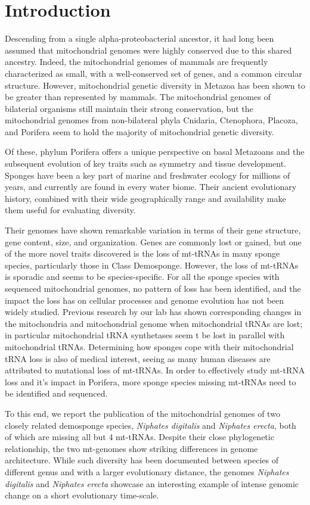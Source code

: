\documentclass[../main.tex]{subfiles}
\begin{document}
\newpage
\section{Introduction}
Descending from a single alpha-proteobacterial ancestor, it had long been assumed that mitochondrial genomes were highly conserved due to this shared ancestry. Indeed, the mitochondrial genomes of mammals are frequently characterized as small, with a well-conserved set of genes, and a common circular structure. However,  mitochondrial genetic diversity in Metazoa has been shown to be greater than represented by mammals. The mitochondrial genomes of bilaterial organisms still maintain their strong conservation, but the mitochondrial genomes from non-bilateral phyla Cnidaria, Ctenophora, Placoza, and Porifera seem to hold the majority of mitochondrial genetic diversity. 

 Of these, phylum Porifera offers a unique perspective on basal Metazoans and the subsequent evolution of key traits such as symmetry and tissue development. Sponges have been a key part of marine and freshwater ecology for millions of years, and currently are found in every water biome. Their ancient evolutionary history, combined with their wide geographically range and availability make them useful for evaluating diversity.
 
Their genomes have shown remarkable variation in terms of their gene structure, gene content, size, and organization. Genes are commonly lost or gained, but one of the more novel traits discovered is the loss of mt-tRNAs in many sponge species, particularly those in Class Demosponge. However, the loss of mt-tRNAs is sporadic and seems to be species-specific. For all the sponge species with sequenced mitochondrial genomes, no pattern of loss has been identified, and the impact the loss has on cellular processes and genome evolution has not been widely studied. Previous research by our lab has shown corresponding changes in the mitochondria and mitochondrial genome when mitochondrial tRNAs are lost; in particular mitochondrial tRNA synthetases seem t be lost in parallel with mitochondrial tRNAs. Determining how sponges cope with their mitochondrial tRNA loss is also of medical interest, seeing as many human diseases are attributed to mutational loss of mt-tRNAs. In order to effectively study mt-tRNA loss and it's impact in Porifera, more sponge species missing mt-tRNAs need to be identified and sequenced.

To this end, we report the publication of the mitochondrial genomes of two closely related demosponge species, \emph{Niphates digitalis} and \emph{Niphates erecta}, both of which are missing all but 4 mt-tRNAs. Despite their close phylogenetic relationship, the two mt-genomes show striking differences in genome architecture. While such diversity has been documented between species of different genus and with a larger evolutionary distance, the genomes \emph{Niphates digitalis} and \emph{Niphates erecta} showcase an interesting example of intense genomic change on a short evolutionary time-scale. 
\end{document}
